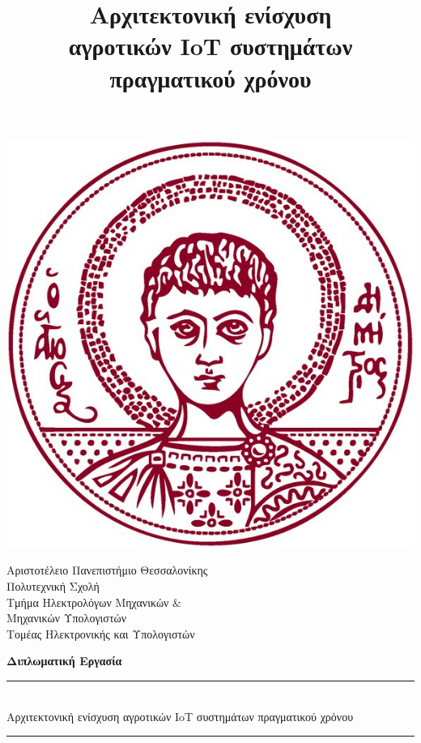 \documentclass[a4paper,12 pt,oneside]{report}
\title{Αρχιτεκτονική ενίσχυση\\
αγροτικών IoT συστημάτων
πραγματικού χρόνου}
\begin{document}
\begin{titlepage}

	\noindent
	\begin{minipage}[c]{0.3\textwidth}
		\includegraphics[width=\linewidth]{./images/title/authLogoTr.jpg}
	\end{minipage}
	\hfill
	\begin{minipage}[c]{0.65\textwidth}
		\raggedright
		\large Αριστοτέλειο Πανεπιστήμιο Θεσσαλονίκης \\
		Πολυτεχνική Σχολή \\
		Τμήμα Ηλεκτρολόγων Μηχανικών $\&$ \\ Μηχανικών Υπολογιστών\\
		\normalsize{Τομέας Ηλεκτρονικής και Υπολογιστών} \\[5cm]
	\end{minipage}

	\vspace{1.5cm}

	\begin{center}
		\Large \textbf{Διπλωματική Εργασία} \\[0.8cm]

		\rule{350pt}{2pt} \\[0.6cm]

		{\fontsize{20.26pt}{1em}\selectfont
		Αρχιτεκτονική ενίσχυση
		αγροτικών IoT συστημάτων
		πραγματικού χρόνου
		}
		\rule{350pt}{2pt} \\[2cm]


\end{center}
\end{titlepage}
\end{document}
